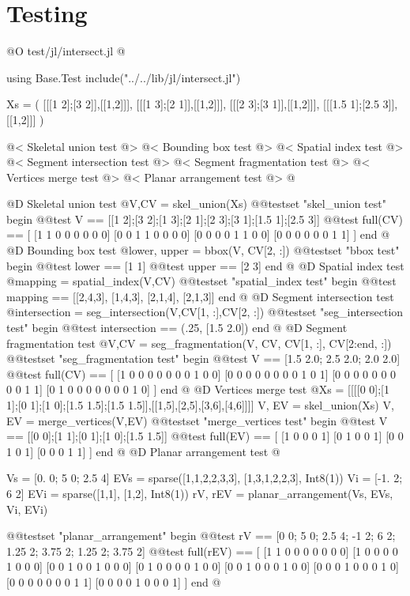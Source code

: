 \documentclass[10pt,oneside]{article}
\begin{document}
\section{Testing}
@O test/jl/intersect.jl
@{using Base.Test
include("../../lib/jl/intersect.jl")

Xs = (
    [[[1 2];[3 2]],[[1,2]]],
    [[[1 3];[2 1]],[[1,2]]],
    [[[2 3];[3 1]],[[1,2]]],
    [[[1.5 1];[2.5 3]],[[1,2]]]
)

@< Skeletal union test @>
@< Bounding box test @>
@< Spatial index test @>
@< Segment intersection test @>
@< Segment fragmentation test @>
@< Vertices merge test @>
@< Planar arrangement test @>
@}
@D Skeletal union test
@{V,CV = skel_union(Xs)
@@testset "skel_union test" begin
    @@test V == [[1 2];[3 2];[1 3];[2 1];[2 3];[3 1];[1.5 1];[2.5 3]]
    @@test full(CV) == [
        [1 1 0 0 0 0 0 0]
        [0 0 1 1 0 0 0 0]
        [0 0 0 0 1 1 0 0]
        [0 0 0 0 0 0 1 1]
    ]
end
@}
@D Bounding box test
@{lower, upper = bbox(V, CV[2, :])
@@testset "bbox test" begin
    @@test lower == [1 1]
    @@test upper == [2 3]
end
@}
@D Spatial index test
@{mapping = spatial_index(V,CV)
@@testset "spatial_index test" begin
    @@test mapping == [[2,4,3], [1,4,3], [2,1,4], [2,1,3]]
end
@}
@D Segment intersection test
@{intersection = seg_intersection(V,CV[1, :],CV[2, :])
@@testset "seg_intersection test" begin
    @@test intersection == (.25, [1.5 2.0])
end
@}
@D Segment fragmentation test
@{V,CV = seg_fragmentation(V, CV, CV[1, :], CV[2:end, :])
@@testset "seg_fragmentation test" begin
    @@test V == [1.5 2.0; 2.5 2.0; 2.0 2.0]
    @@test full(CV) == [
        [1 0 0 0 0 0 0 0 1 0 0]
        [0 0 0 0 0 0 0 0 1 0 1]
        [0 0 0 0 0 0 0 0 0 1 1]
        [0 1 0 0 0 0 0 0 0 1 0]
    ]
end
@}
@D Vertices merge test
@{Xs = [[[[0 0];[1 1];[0 1];[1 0];[1.5 1.5];[1.5 1.5]],[[1,5],[2,5],[3,6],[4,6]]]]
V, EV = skel_union(Xs)
V, EV = merge_vertices(V,EV)
@@testset "merge_vertices test" begin
    @@test V == [[0 0];[1 1];[0 1];[1 0];[1.5 1.5]]
    @@test full(EV) == [
        [1 0 0 0 1]
        [0 1 0 0 1]
        [0 0 1 0 1]
        [0 0 0 1 1]
    ]
end
@}
@D Planar arrangement test
@{Vs = [0. 0; 5 0; 2.5 4]
EVs = sparse([1,1,2,2,3,3], [1,3,1,2,2,3], Int8(1))
Vi = [-1. 2; 6 2]
EVi = sparse([1,1], [1,2], Int8(1))
rV, rEV = planar_arrangement(Vs, EVs, Vi, EVi)

@@testset "planar_arrangement" begin
    @@test rV == [0 0; 5 0; 2.5 4; -1 2; 6 2; 1.25 2; 3.75 2; 1.25 2; 3.75 2]
    @@test full(rEV) == [
        [1 1 0 0 0 0 0 0 0]
        [1 0 0 0 0 1 0 0 0]
        [0 0 1 0 0 1 0 0 0]
        [0 1 0 0 0 0 1 0 0]
        [0 0 1 0 0 0 1 0 0]
        [0 0 0 1 0 0 0 1 0]
        [0 0 0 0 0 0 0 1 1]
        [0 0 0 0 1 0 0 0 1]
    ]
end
@}
\end{document}
